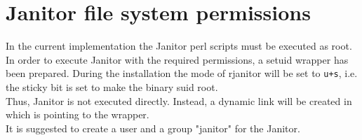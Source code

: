 \section{Janitor file system permissions}

In the current implementation the Janitor perl scripts must be executed as root. In order to execute Janitor with the required permissions,
a setuid wrapper has been prepared. During the installation  the mode of rjanitor will be set to \texttt{u+s},
i.e. the sticky bit is set to make the binary suid root. \\

Thus, Janitor is not executed directly. Instead, a dynamic link will be created in  which is pointing to
the wrapper.\\

It is suggested to create a user and a group "janitor" for the Janitor.\\

% 


